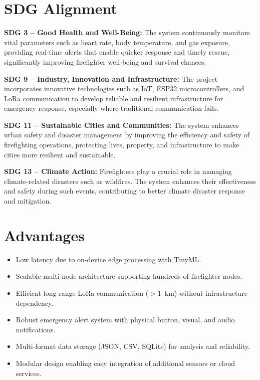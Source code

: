 \documentclass[conference]{IEEEtran}
\begin{document}
	\section{SDG Alignment}
	
	\textbf{SDG 3 -- Good Health and Well-Being:} The system continuously monitors
	vital parameters such as heart rate, body temperature, and gas exposure,
	providing real-time alerts that enable quicker response and timely rescue,
	significantly improving firefighter well-being and survival chances.
	
	\textbf{SDG 9 -- Industry, Innovation and Infrastructure:} The project
	incorporates innovative technologies such as IoT, ESP32 microcontrollers, and
	LoRa communication to develop reliable and resilient infrastructure for emergency
	response, especially where traditional communication fails.
	
	\textbf{SDG 11 -- Sustainable Cities and Communities:} The system enhances
	urban safety and disaster management by improving the efficiency and safety of
	firefighting operations, protecting lives, property, and infrastructure to make
	cities more resilient and sustainable.
	
	\textbf{SDG 13 -- Climate Action:} Firefighters play a crucial role in managing
	climate-related disasters such as wildfires. The system enhances their
	effectiveness and safety during such events, contributing to better climate
	disaster response and mitigation.
	
	\section{Advantages}
	
	\begin{itemize}
		\item Low latency due to on-device edge processing with TinyML.
		\item Scalable multi-node architecture supporting hundreds of firefighter nodes.
		\item Efficient long-range LoRa communication ($>$1~km) without infrastructure
		dependency.
		\item Robust emergency alert system with physical button, visual, and audio
		notifications.
		\item Multi-format data storage (JSON, CSV, SQLite) for analysis and
		reliability.
		\item Modular design enabling easy integration of additional sensors or cloud
		services.
	\end{itemize}
	
\end{document}
